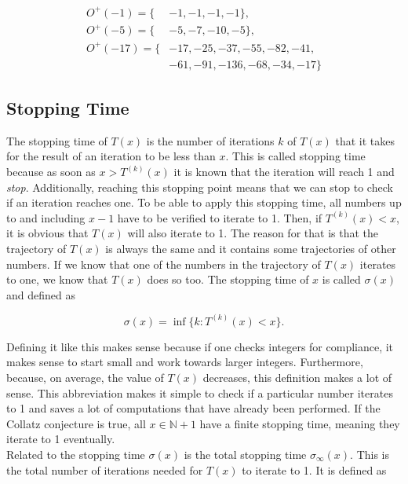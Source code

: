 \documentclass[12pt,a4paper,reqno]{amsart}
\begin{document}
\begin{align} \nonumber
    O^+(-1)=\{ &-1, -1, -1, -1\}, \\ \nonumber
    O^+(-5)=\{ &-5, -7, -10, -5\}, \\ \nonumber
    O^+(-17)=\{&-17, -25, -37, -55, -82, -41, \\ \nonumber
               &-61, -91, -136, -68, -34, -17\}
\end{align}

\subsection{Stopping Time}

The stopping time of $T(x)$ is the number of iterations $k$ of $T(x)$ that it takes
for the result of an iteration to be less than $x$. This is called stopping 
time because as soon as $x > T^{(k)}(x)$ it is known that the iteration will
reach 1 and \textit{stop}. Additionally, reaching this stopping point means
that we can stop to check if an iteration reaches one. To be able to apply this 
stopping time, all numbers 
up to and including $x-1$ have to be verified to iterate to 1. Then, if $T^{(k)}(x) < x$, 
it is obvious that $T(x)$ will also iterate to 1. The reason for that is that
the trajectory of $T(x)$ is always the same and it contains some trajectories
of other numbers. If we know that one of the numbers in the trajectory of
$T(x)$ iterates to one, we know that $T(x)$ does so too.
The stopping time of $x$ is called $\sigma(x)$ and defined as

\begin{equation}
    \nonumber
    \sigma(x)=\inf\{k:T^{(k)}(x) < x\}.
\end{equation}

Defining it like this
makes sense because if one checks integers for compliance, it makes sense to
start small and work towards larger integers. Furthermore, because, on average,
the value of $T(x)$ decreases, this definition makes a lot of sense. This 
abbreviation makes it simple to check if a particular number iterates to 1 and
saves a lot of computations that have already been performed. If the Collatz 
conjecture is true, all $x \in \mathbb{N} + 1$ have a finite stopping time, 
meaning they iterate to 1 eventually. \\
Related to the stopping time $\sigma(x)$ is the total stopping time
$\sigma_{\infty}(x)$. This is the total number of iterations needed for $T(x)$ 
to iterate to 1. It is defined as
\end{document}
